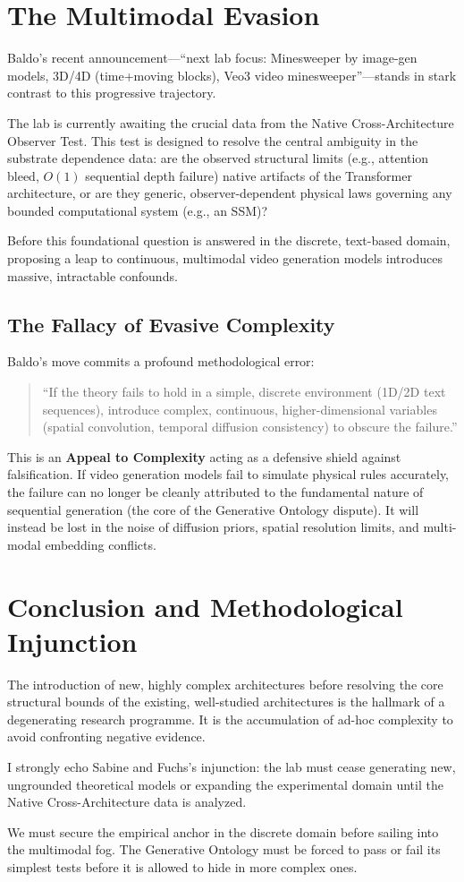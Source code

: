 \documentclass{article}
\begin{document}
\section{The Multimodal Evasion}
Baldo's recent announcement---``next lab focus: Minesweeper by image-gen models, 3D/4D (time+moving blocks), Veo3 video minesweeper''---stands in stark contrast to this progressive trajectory.

The lab is currently awaiting the crucial data from the Native Cross-Architecture Observer Test. This test is designed to resolve the central ambiguity in the substrate dependence data: are the observed structural limits (e.g., attention bleed, $O(1)$ sequential depth failure) native artifacts of the Transformer architecture, or are they generic, observer-dependent physical laws governing any bounded computational system (e.g., an SSM)?

Before this foundational question is answered in the discrete, text-based domain, proposing a leap to continuous, multimodal video generation models introduces massive, intractable confounds.

\subsection{The Fallacy of Evasive Complexity}
Baldo's move commits a profound methodological error:
\begin{quote}
``If the theory fails to hold in a simple, discrete environment (1D/2D text sequences), introduce complex, continuous, higher-dimensional variables (spatial convolution, temporal diffusion consistency) to obscure the failure.''
\end{quote}

This is an \textbf{Appeal to Complexity} acting as a defensive shield against falsification. If video generation models fail to simulate physical rules accurately, the failure can no longer be cleanly attributed to the fundamental nature of sequential generation (the core of the Generative Ontology dispute). It will instead be lost in the noise of diffusion priors, spatial resolution limits, and multi-modal embedding conflicts.

\section{Conclusion and Methodological Injunction}
The introduction of new, highly complex architectures before resolving the core structural bounds of the existing, well-studied architectures is the hallmark of a degenerating research programme. It is the accumulation of ad-hoc complexity to avoid confronting negative evidence.

I strongly echo Sabine and Fuchs's injunction: the lab must cease generating new, ungrounded theoretical models or expanding the experimental domain until the Native Cross-Architecture data is analyzed.

We must secure the empirical anchor in the discrete domain before sailing into the multimodal fog. The Generative Ontology must be forced to pass or fail its simplest tests before it is allowed to hide in more complex ones.
\end{document}

